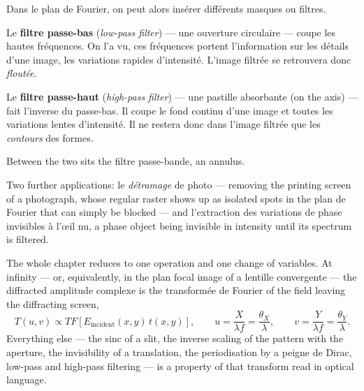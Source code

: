 Dans le plan de Fourier, on peut alors insérer différents masques ou filtres.
\begin{subpart}
  \item Le \textbf{filtre passe-bas} (\textit{low-pass filter}) --- une ouverture
    circulaire --- coupe les hautes fréquences. On l'a vu, ces fréquences portent
    l'information sur les détails d'une image, les variations rapides
    d'intensité. L'image filtrée se retrouvera donc \emph{floutée}.
  \item Le \textbf{filtre passe-haut} (\textit{high-pass filter}) --- une
    pastille absorbante (on the axis) --- fait l'inverse du passe-bas. Il coupe
    le fond continu d'une image et toutes les variations lentes d'intensité. Il
    ne restera donc dans l'image filtrée que les \emph{contours} des formes.
  \item Between the two sits the filtre passe-bande, an annulus.
\end{subpart}

\begin{remark}
  Two further applications: le \textit{détramage} de photo --- removing the
  printing screen of a photograph, whose regular raster shows up as isolated
  spots in the plan de Fourier that can simply be blocked --- and l'extraction
  des variations de phase invisibles à l'œil nu, a phase object being invisible
  in intensity until its spectrum is filtered.
\end{remark}

\begin{conclusion}
  The whole chapter reduces to one operation and one change of variables. At
  infinity --- or, equivalently, in the plan focal image of a lentille
  convergente --- the diffracted amplitude complexe is the transformée de
  Fourier of the field leaving the diffracting screen,
  \[
    T(u,v) \propto TF\!\left[E_{\text{incident}}(x,y)\, t(x,y)\right],
    \qquad
    u = \frac{X}{\lambda f} = \frac{\theta_X}{\lambda},
    \qquad
    v = \frac{Y}{\lambda f} = \frac{\theta_Y}{\lambda}.
  \]
  Everything else --- the sinc of a slit, the inverse scaling of the pattern with
  the aperture, the invisibility of a translation, the periodisation by a
  peigne de Dirac, low-pass and high-pass filtering --- is a property of that
  transform read in optical language.
\end{conclusion}
